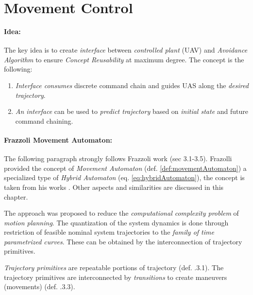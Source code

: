 \section{Movement Control}\label{s:movementAutomatonTheory}

\paragraph{Idea:} The key idea is to create \emph{interface} between \emph{controlled plant} (UAV) and \emph{Avoidance Algorithm} to ensure \emph{Concept Reusability} at maximum degree.  The concept is the following:

\begin{enumerate}

    \item \emph{Interface consumes} discrete command chain and guides UAS along the \emph{desired trajectory}.
    
    \item \emph{An interface} can be used to \emph{predict trajectory} based on \emph{initial state} and future command chaining. 
\end{enumerate}


\paragraph{Frazzoli Movement Automaton:} The following paragraph strongly follows Frazzoli work \cite{frazzoli2001robust} (sec 3.1-3.5). Frazolli provided the concept of \emph{Movement Automaton} (def. \ref{def:movementAutomaton}) a specialized type of \emph{Hybrid Automaton} (eq. \ref{eq:hybridAutomaton}), the concept is taken from his works \cite{frazzoli2001robust,frazzoli2000trajectory}. Other aspects and similarities are discussed in this chapter. 


The approach was proposed to reduce the \emph{computational complexity problem} of \emph{motion planning}. The quantization of the system dynamics is done through restriction of feasible nominal system trajectories to the \emph{family of time parametrized curves}. These can be obtained by the interconnection of trajectory primitives.

\emph{Trajectory primitives} are repeatable portions of trajectory (def. \cite{frazzoli2001robust}.3.1). The trajectory primitives are interconnected by \emph{transitions} to create maneuvers (movements) (def. \cite{frazzoli2001robust}.3.3). 

